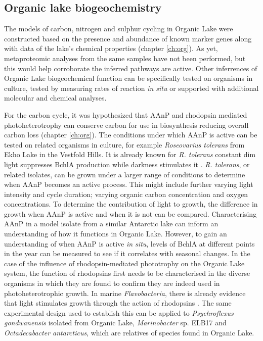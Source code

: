 \subsection{Organic lake biogeochemistry}
The models of carbon, nitrogen and sulphur cycling in Organic Lake were constructed based on the presence and abundance of known marker genes  along with data of the lake's chemical properties (chapter \ref{ch:org}).
As yet, metaproteomic analyses from the same samples have not been performed, but this would help corroborate the inferred pathways are active. 
Other inferrences of Organic Lake biogeochemical function can be specifically tested on organisms in culture, tested by measuring rates of reaction \emph{in situ} or supported with additional molecular and chemical analyses.

For the carbon cycle, it was hypothesized that \ac{AAnP} and rhodopsin mediated photoheterotrophy can conserve carbon for use in biosynthesis  reducing overall carbon loss (chapter \ref{ch:org}).
The conditions under which \ac{AAnP} is active can be tested on related organisms in culture, for example \emph{Roseovarius tolerans} from Ekho Lake in the Vestfold Hills. 
It is already known for \emph{R. tolerans} constant dim light suppresses \ac{BchlA} production while darkness stimulates it \cite{Labrenz1999}.
\emph{R. tolerans}, or related isolates, can be grown under a larger range of conditions to determine when \ac{AAnP} becomes an active process.
This might include further varying light intensity and cycle duration; varying organic carbon concentration and oxygen concentrations.
To determine the contribution of light to growth, the difference in growth when \ac{AAnP} is active and when it is not can be compared.
Characterising \ac{AAnP} in a model isolate from a similar Antarctic lake can inform an understanding of how it functions in Organic Lake.
However, to gain an understanding of when \ac{AAnP} is active \emph{in situ}, levels of \ac{BchlA} at different points in the year can be measured to see if it correlates with seasonal changes.
In the case of the influence of rhodopsin-mediated phototrophy on the Organic Lake system, the function of rhodopsins first needs to be characterised in the diverse organisms in which they are found to confirm they are indeed used in photoheterotrophic growth.
In marine \emph{Flavobacteria}, there is already evidence that light stimulates growth through the action of rhodopsins \cite{Gomez-Consarnau2007}.
The same experimental design used to establish this can be applied to \emph{Psychroflexus gondwanensis} isolated from Organic Lake, \emph{Marinobacter} sp. ELB17 and \emph{Octadecabacter antarcticus}, which are relatives of species found in Organic Lake.

